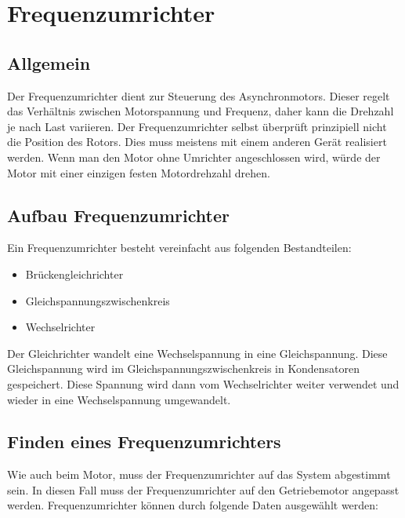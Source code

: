 \section{Frequenzumrichter}
\label{sec:frequenzumrichter}

\subsection{Allgemein}
\label{sec:allgemeinfrequenzumrichter}

Der Frequenzumrichter dient zur Steuerung des Asynchronmotors. Dieser regelt das Verhältnis zwischen Motorspannung und Frequenz, daher kann die Drehzahl je nach Last variieren. Der Frequenzumrichter selbst überprüft prinzipiell nicht die Position des Rotors. Dies muss meistens mit einem anderen Gerät realisiert werden. Wenn man den Motor ohne Umrichter angeschlossen wird, würde der Motor mit einer einzigen festen Motordrehzahl drehen. 

\subsection{Aufbau Frequenzumrichter}
\label{sec:aufbauFrequenzumrichter}

Ein Frequenzumrichter besteht vereinfacht aus folgenden Bestandteilen:

\begin{itemize}
	\item{Brückengleichrichter} %
	\item{Gleichspannungszwischenkreis}
	\item{Wechselrichter}
\end{itemize}

Der Gleichrichter wandelt eine Wechselspannung in eine Gleichspannung. Diese Gleichspannung wird im Gleichspannungszwischenkreis in Kondensatoren gespeichert. Diese Spannung wird dann vom Wechselrichter weiter verwendet und wieder in eine Wechselspannung umgewandelt.

\subsection{Finden eines Frequenzumrichters}
\label{sec:findenEinesFrequenzumrichter}

Wie auch beim Motor, muss der Frequenzumrichter auf das System abgestimmt sein. In diesen Fall muss der Frequenzumrichter auf den Getriebemotor angepasst werden. Frequenzumrichter können durch folgende Daten ausgewählt werden:

